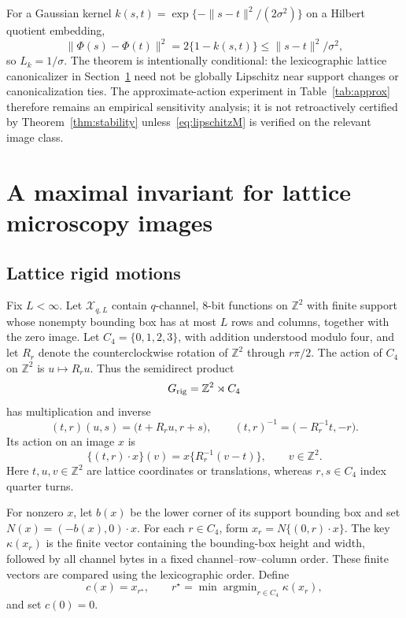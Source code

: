 \documentclass[11pt]{article}
\theoremstyle{plain}
\theoremstyle{definition}
\numberwithin{equation}{section}
\DeclareMathOperator{\argmin}{argmin}
\newcommand{\Z}{\mathbb Z}
\newcommand{\1}{\mathbf 1}
\newcommand{\calX}{\mathcal X}
\begin{document}
For a Gaussian kernel $k(s,t)=\exp\{-\|s-t\|^2/(2\sigma^2)\}$ on a Hilbert quotient embedding,
\[
\|\Phi(s)-\Phi(t)\|^2=2\{1-k(s,t)\}\le\|s-t\|^2/\sigma^2,
\]
so $L_k=1/\sigma$. The theorem is intentionally conditional: the lexicographic lattice canonicalizer in Section~\ref{sec:lattice} need not be globally Lipschitz near support changes or canonicalization ties. The approximate-action experiment in Table~\ref{tab:approx} therefore remains an empirical sensitivity analysis; it is not retroactively certified by Theorem~\ref{thm:stability} unless~\eqref{eq:lipschitzM} is verified on the relevant image class.

\section{A maximal invariant for lattice microscopy images}\label{sec:lattice}

\subsection{Lattice rigid motions}

Fix $L<\infty$. Let $\calX_{q,L}$ contain $q$-channel, 8-bit functions on $\Z^2$ with finite support whose nonempty bounding box has at most $L$ rows and columns, together with the zero image. Let $C_4=\{0,1,2,3\}$, with addition understood modulo four, and let
$R_r$ denote the counterclockwise rotation of $\Z^2$ through
$r\pi/2$. The action of $C_4$ on $\Z^2$ is $u\mapsto R_ru$. Thus the
semidirect product
\[
G_{\rm rig}=\Z^2\rtimes C_4
\]
has multiplication and inverse
\[
(t,r)(u,s)=\bigl(t+R_ru,r+s\bigr),
\qquad
(t,r)^{-1}=\bigl(-R_r^{-1}t,-r\bigr).
\]
Its action on an image $x$ is
\begin{equation}\label{eq:rigaction}
	\{(t,r)\cdot x\}(v)
	=
	x\{R_r^{-1}(v-t)\},
	\qquad v\in\Z^2.
\end{equation}
Here $t,u,v\in\Z^2$ are lattice coordinates or translations, whereas
$r,s\in C_4$ index quarter turns.

For nonzero $x$, let $b(x)$ be the lower corner of its support bounding box and set $N(x)=(-b(x),0)\cdot x$. For each $r\in C_4$, form $x_r=N\{(0,r)\cdot x\}$. The key $\kappa(x_r)$ is the finite vector containing the
	bounding-box height and width, followed by all channel bytes in a
	fixed channel--row--column order. These finite vectors are
compared using the lexicographic order. Define
\begin{equation}\label{eq:canonical}
c(x)=x_{r^\star},\qquad r^\star=\min\argmin_{r\in C_4}\kappa(x_r),
\end{equation}
and set $c(0)=0$.
\end{document}
